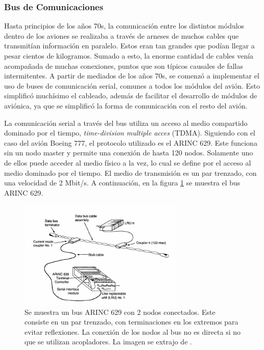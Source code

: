 \subsubsection{Bus de Comunicaciones}

Hasta principios de los años 70s, la comunicación entre los distintos módulos dentro de los aviones se realizaba a través de arneses de muchos cables que transmitían información en paralelo. Estos eran tan grandes que podían llegar a pesar cientos de kilogramos. Sumado a esto, la enorme cantidad de cables venía acompañada de muchas conexiones, puntos que son típicos causales de fallas intermitentes. A partir de mediados de los años 70s, se comenzó a implementar el uso de buses de comunicación serial, comunes a todos los módulos del avión. Esto simplificó muchísimo el cableado, además de facilitar el desarrollo de módulos de aviónica, ya que se simplificó la forma de comunicación con el resto del avión.

La comunicación serial a través del bus utiliza un acceso al medio compartido dominado por el tiempo, \textit{time-division multiple acces} (TDMA). Siguiendo con el caso del avión Boeing 777, el protocolo utilizado es el ARINC 629. Este funciona sin un nodo master y permite una conexión de hasta 120 nodos. Solamente uno de ellos puede acceder al medio físico a la vez, lo cual se define por el acceso al medio dominado por el tiempo. El medio de transmisión es un par trenzado, con una velocidad de 2 Mbit/s. A continuación, en la figura \ref{fig:ARINC_629_bus} se muestra el bus ARINC 629.

\begin{figure}[htb]
    \centering
    \includegraphics[width=0.7\textwidth]{img/ARINC_629_bus.png}
    \caption{Se muestra un bus ARINC 629 con 2 nodos conectados. Este consiste en un par trenzado, con terminaciones en los extremos para evitar reflexiones. La conexión de los nodos al bus no es directa si no que se utilizan acopladores. La imagen se extrajo de \cite{yeh1996triple}.}
    \label{fig:ARINC_629_bus}    
\end{figure}

